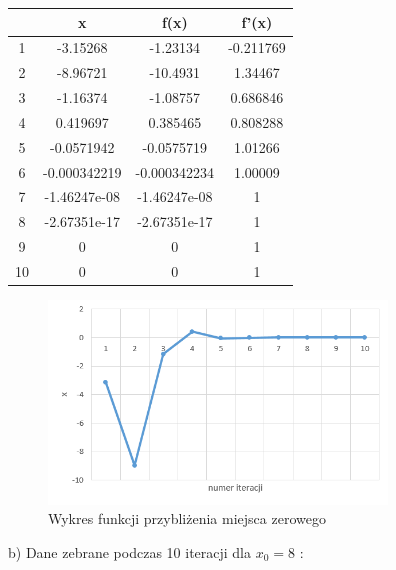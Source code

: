 \documentclass{article}
\begin{document}
\begin{table}[H]
    \centering
    \begin{tabular}{|c|c||c||c|} \hline
     & x & f(x) & f'(x) \\ \hline
1 &-3.15268 &  -1.23134 & -0.211769\\ \hline
2 & -8.96721  & -10.4931  &  1.34467\\ \hline
3 & -1.16374 &  -1.08757 &  0.686846\\ \hline
4 & 0.419697 &  0.385465 &  0.808288\\ \hline
5 & -0.0571942 & -0.0575719  &  1.01266\\ \hline
6 & -0.000342219 & -0.000342234 &   1.00009\\ \hline
7 & -1.46247e-08 & -1.46247e-08 &         1\\ \hline
8 & -2.67351e-17 & -2.67351e-17  &        1\\ \hline
9 & 0      &    0       &   1\\ \hline
10 & 0    &      0       &   1\\ \hline
    \end{tabular}

    \label{tab:my_label}
\end{table}

\begin{figure}[H]
\centering
\includegraphics[width=9cm]{Nu.png}
\caption{ Wykres funkcji przybliżenia miejsca zerowego}
\label{fig:obrazek Nu}
\end{figure}
\newpage
b) Dane zebrane podczas 10 iteracji dla $x_0=8$ :
\end{document}
